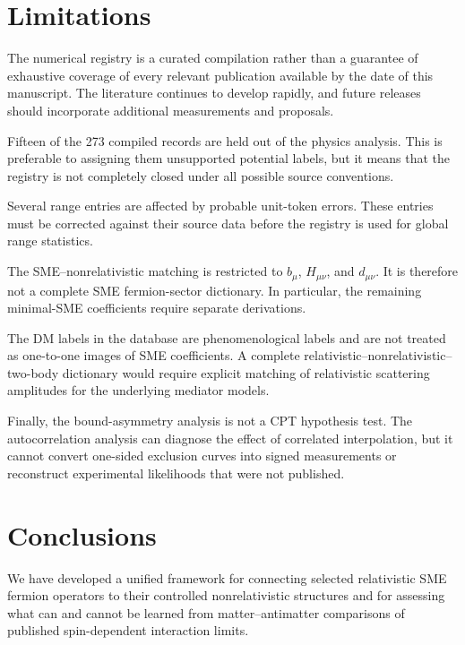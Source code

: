 \documentclass[aps,prd,reprint,superscriptaddress,nofootinbib]{revtex4-2}
\begin{document}
	\section{Limitations}
	
	The numerical registry is a curated compilation rather than a guarantee
	of exhaustive coverage of every relevant publication available by the
	date of this manuscript. The literature continues to develop rapidly,
	and future releases should incorporate additional measurements and
	proposals.
	
	Fifteen of the 273 compiled records are held out of the physics
	analysis. This is preferable to assigning them unsupported potential
	labels, but it means that the registry is not completely closed under
	all possible source conventions.
	
	Several range entries are affected by probable unit-token errors. These
	entries must be corrected against their source data before the registry
	is used for global range statistics.
	
	The SME--nonrelativistic matching is restricted to
	$b_\mu$, $H_{\mu\nu}$, and $d_{\mu\nu}$. It is therefore not a complete
	SME fermion-sector dictionary. In particular, the remaining minimal-SME
	coefficients require separate derivations.
	
	The DM labels in the database are phenomenological labels and are not
	treated as one-to-one images of SME coefficients. A complete
	relativistic--nonrelativistic--two-body dictionary would require explicit
	matching of relativistic scattering amplitudes for the underlying
	mediator models.
	
	Finally, the bound-asymmetry analysis is not a CPT hypothesis test.
	The autocorrelation analysis can diagnose the effect of correlated
	interpolation, but it cannot convert one-sided exclusion curves into
	signed measurements or reconstruct experimental likelihoods that were
	not published.
	
	\section{Conclusions}
	
	We have developed a unified framework for connecting selected
	relativistic SME fermion operators to their controlled
	nonrelativistic structures and for assessing what can and cannot be
	learned from matter--antimatter comparisons of published
	spin-dependent interaction limits.
	
\end{document}

